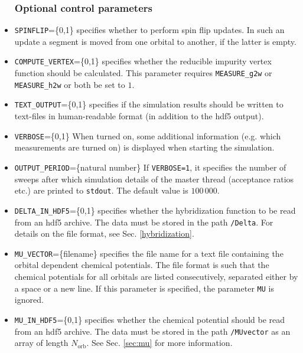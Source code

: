 \documentclass[aps,prb,floatfix,superscriptaddress,twocolumn,notitlepage]{revtex4-1}
\begin{document}
\begin{itemize}
\subsubsection{Optional control parameters}

\item \verb#SPINFLIP#=\{0,1\} specifies whether to perform spin flip updates. In such an update a segment is moved from one orbital to another, if the latter is empty.

\item \verb#COMPUTE_VERTEX#=\{0,1\} specifies whether the reducible impurity vertex function should be calculated. This parameter requires \verb#MEASURE_g2w# or \verb#MEASURE_h2w# or both be set to $1$.

\item \verb#TEXT_OUTPUT#=\{0,1\} specifies if the simulation results should be written to text-files in human-readable format (in addition to the hdf5 output).

\item \verb#VERBOSE#=\{0,1\} When turned on, some additional information (e.g. which measurements are turned on) is displayed when starting the simulation.

\item \verb#OUTPUT_PERIOD#=\{natural number\} If \verb#VERBOSE=1#, it specifies the number of sweeps after which simulation details of the master thread (acceptance ratios etc.) are printed to \verb#stdout#. The default value is $100\,000$.

\item \verb#DELTA_IN_HDF5#=\{0,1\} specifies whether the hybridization function to be read from an hdf5 archive. The data must be stored in the path \verb#/Delta#. For details on the file format, see Sec. \ref{hybridization}.

\item\verb#MU_VECTOR#=\{filename\} specifies the file name for a text file containing the orbital dependent chemical potentials. The file format is such that the chemical potentials for all orbitals are listed consecutively, separated either by a space or a new line. If this parameter is specified, the parameter \verb#MU# is ignored.

\item\verb#MU_IN_HDF5#=\{0,1\} specifies whether the chemical potential should be read from an hdf5 archive. The data must be stored in the path \verb#/MUvector# as an array of length $N_{\text{orb}}$. See Sec. \ref{sec:mu} for more information.


\end{itemize}
\end{document}
